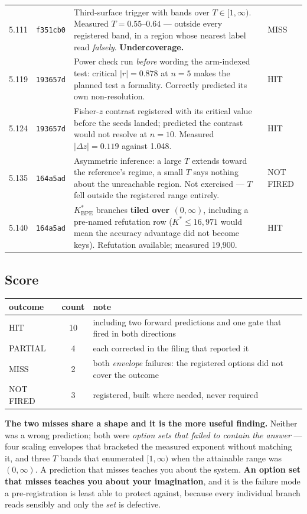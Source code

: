 {\begin{longtable}{@{}p{0.9cm}p{1.7cm}p{8.4cm}p{2.3cm}@{}}
5.111 & \texttt{f351cb0} & Third-surface trigger with bands over $T \in [1, \infty)$. Measured
$T = 0.55$--$0.64$ --- outside every registered band, in a region whose nearest label read
\emph{falsely}. \textbf{Undercoverage.} & MISS \\

5.119 & \texttt{193657d} & Power check run \emph{before} wording the arm-indexed test: critical
$|r| = 0.878$ at $n=5$ makes the planned test a formality. Correctly predicted its own
non-resolution. & HIT \\

5.124 & \texttt{193657d} & Fisher-$z$ contrast registered with its critical value before the seeds
landed; predicted the contrast would not resolve at $n = 10$. Measured $|\Delta z| = 0.119$ against
1.048. & HIT \\

5.135 & \texttt{164a5ad} & Asymmetric inference: a large $T$ extends toward the reference's regime, a
small $T$ says nothing about the unreachable region. Not exercised --- $T$ fell outside the
registered range entirely. & NOT FIRED \\

5.140 & \texttt{164a5ad} & $K^*_{\text{BPE}}$ branches \textbf{tiled over $(0,\infty)$}, including a
pre-named refutation row ($K^* \le 16{,}971$ would mean the accuracy advantage did not become keys).
Refutation available; measured 19{,}900. & HIT \\
\end{longtable}
}

\subsection*{Score}

\begin{center}\small
\begin{tabular}{@{}lcl@{}}
\toprule
outcome & count & note \\
\midrule
HIT & 10 & including two forward predictions and one gate that fired in both directions \\
PARTIAL & 4 & each corrected in the filing that reported it \\
MISS & 2 & both \emph{envelope} failures: the registered options did not cover the outcome \\
NOT FIRED & 3 & registered, built where needed, never required \\
\bottomrule
\end{tabular}
\end{center}

\medskip
\noindent \textbf{The two misses share a shape and it is the more useful finding.} Neither was a
wrong prediction; both were \emph{option sets that failed to contain the answer} --- four scaling
envelopes that bracketed the measured exponent without matching it, and three $T$ bands that
enumerated $[1,\infty)$ when the attainable range was $(0,\infty)$. A prediction that misses teaches
you about the system. \textbf{An option set that misses teaches you about your imagination}, and it
is the failure mode a pre-registration is least able to protect against, because every individual
branch reads sensibly and only the \emph{set} is defective.
